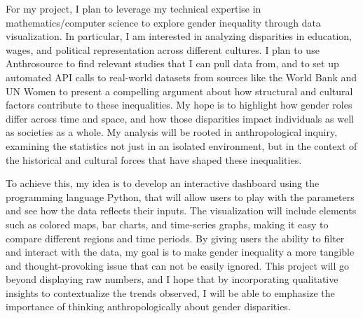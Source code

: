 \documentclass{article}
\begin{document}
For my project, I plan to leverage my technical expertise in mathematics/computer science to explore gender inequality through data visualization.
In particular, I am interested in analyzing disparities in education, wages, and political representation across different cultures.
I plan to use Anthrosource to find relevant studies that I can pull data from, and to set up automated API calls to real-world datasets from sources like the World Bank and UN Women to present a compelling argument about how structural and cultural factors contribute to these inequalities.
My hope is to highlight how gender roles differ across time and space, and how those disparities impact individuals as well as societies as a whole.
My analysis will be rooted in anthropological inquiry, examining the statistics not just in an isolated environment, but in the context of the historical and cultural forces that have shaped these inequalities.

To achieve this, my idea is to develop an interactive dashboard using the programming language Python, that will allow users to play with the parameters and see how the data reflects their inputs.
The visualization will include elements such as colored maps, bar charts, and time-series graphs, making it easy to compare different regions and time periods.
By giving users the ability to filter and interact with the data, my goal is to make gender inequality a more tangible and thought-provoking issue that can not be easily ignored.
This project will go beyond displaying raw numbers, and I hope that by incorporating qualitative insights to contextualize the trends observed, I will be able to emphasize the importance of thinking anthropologically about gender disparities.
\end{document}
